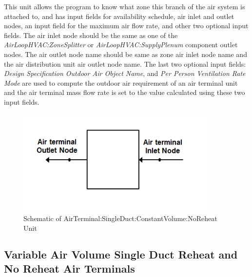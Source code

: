 This unit allows the program to know what zone this branch of the air system is attached to, and has input fields for availability schedule, air inlet and outlet nodes, an input field for the maximum air flow rate, and other two optional input fields. The air inlet node should be the same as one of the \emph{AirLoopHVAC:ZoneSplitter} or \emph{AirLoopHVAC:SupplyPlenum} component outlet nodes. The air outlet node name should be same as zone air inlet node name and the air distribution unit air outlet node name. The last two optional input fields: \textit{Design Specification Outdoor Air Object Name}, and \textit{Per Person Ventilation Rate Mode} are used to compute the outdoor air requirement of an air terminal unit and the air terminal mass flow rate is set to the value calculated using these two input fields. 

\begin{figure}[hbtp] %
\centering
\includegraphics[width=0.9\textwidth, height=0.9\textheight, keepaspectratio=true]{media/SingleDuctConstantVolumeNoReheatAT.png}
\caption{Schematic of AirTerminal:SingleDuct:ConstantVolume:NoReheat Unit \protect \label{fig:schematic-of-airterminal-singleduct}}
\end{figure}

\subsection{Variable Air Volume Single Duct Reheat and No Reheat Air Terminals}\label{variable-air-volume-single-duct-reheat-and-no-reheat-air-terminals}

